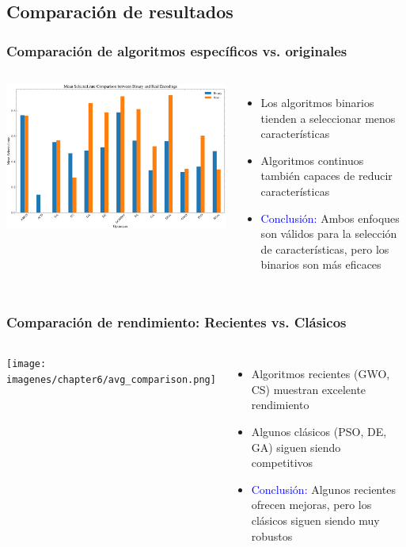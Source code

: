 \subsection{Comparación de resultados}
\begin{frame}
    \frametitle{Comparación de algoritmos específicos vs. originales}
    \begin{columns}
        \includegraphics[width=\textwidth]{imagenes/chapter6/selected_rate_comparison.png}
        \begin{itemize}
            \item<1-> Los algoritmos binarios tienden a seleccionar menos características
            \item<2-> Algoritmos continuos también capaces de reducir características
            \item<3-> \textcolor{blue}{Conclusión:} Ambos enfoques son válidos para la selección de características, pero los binarios son más eficaces
        \end{itemize}
    \end{columns}
\end{frame}

\begin{frame}
    \frametitle{Comparación de rendimiento: Recientes vs. Clásicos}
    \begin{columns}
        \texttt{[image: imagenes/chapter6/avg\_comparison.png]}
        \begin{itemize}
            \item<1-> Algoritmos recientes (GWO, CS) muestran excelente rendimiento
            \item<2-> Algunos clásicos (PSO, DE, GA) siguen siendo competitivos
            \item<3-> \textcolor{blue}{Conclusión:} Algunos recientes ofrecen mejoras, pero los clásicos siguen siendo muy robustos
        \end{itemize}
    \end{columns}
\end{frame}

